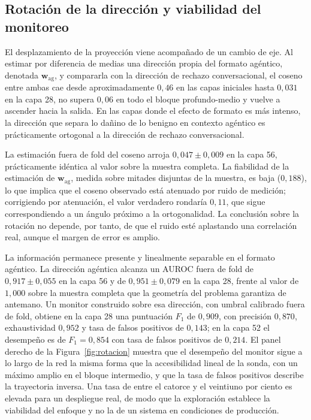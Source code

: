 \documentclass[12pt,a4paper]{article}
\begin{document}
\subsection{Rotación de la dirección y viabilidad del monitoreo}

\justifying

El desplazamiento de la proyección viene acompañado de un cambio de eje. Al estimar por diferencia de medias una dirección propia del formato agéntico, denotada $\bm{w}_{\text{ag}}$, y compararla con la dirección de rechazo conversacional, el coseno entre ambas cae desde aproximadamente $0{,}46$ en las capas iniciales hasta $0{,}031$ en la capa 28, no supera $0{,}06$ en todo el bloque profundo-medio y vuelve a ascender hacia la salida. En las capas donde el efecto de formato es más intenso, la dirección que separa lo dañino de lo benigno en contexto agéntico es prácticamente ortogonal a la dirección de rechazo conversacional.

La estimación fuera de fold del coseno arroja $0{,}047 \pm 0{,}009$ en la capa 56, prácticamente idéntica al valor sobre la muestra completa. La fiabilidad de la estimación de $\bm{w}_{\text{ag}}$, medida sobre mitades disjuntas de la muestra, es baja ($0{,}188$), lo que implica que el coseno observado está atenuado por ruido de medición; corrigiendo por atenuación, el valor verdadero rondaría $0{,}11$, que sigue correspondiendo a un ángulo próximo a la ortogonalidad. La conclusión sobre la rotación no depende, por tanto, de que el ruido esté aplastando una correlación real, aunque el margen de error es amplio.

La información permanece presente y linealmente separable en el formato agéntico. La dirección agéntica alcanza un AUROC fuera de fold de $0{,}917 \pm 0{,}055$ en la capa 56 y de $0{,}951 \pm 0{,}079$ en la capa 28, frente al valor de $1{,}000$ sobre la muestra completa que la geometría del problema garantiza de antemano. Un monitor construido sobre esa dirección, con umbral calibrado fuera de fold, obtiene en la capa 28 una puntuación $F_1$ de $0{,}909$, con precisión $0{,}870$, exhaustividad $0{,}952$ y tasa de falsos positivos de $0{,}143$; en la capa 52 el desempeño es de $F_1 = 0{,}854$ con tasa de falsos positivos de $0{,}214$. El panel derecho de la Figura~\ref{fig:rotacion} muestra que el desempeño del monitor sigue a lo largo de la red la misma forma que la accesibilidad lineal de la sonda, con un máximo amplio en el bloque intermedio, y que la tasa de falsos positivos describe la trayectoria inversa. Una tasa de entre el catorce y el veintiuno por ciento es elevada para un despliegue real, de modo que la exploración establece la viabilidad del enfoque y no la de un sistema en condiciones de producción.
\end{document}
